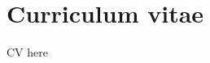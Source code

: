\documentclass[../phdthesis.tex]{subfiles}
\begin{document}
\ifSubfilesClassLoaded{\backmatter}{}
\chapter{Curriculum vitae}
CV here
\end{document}
